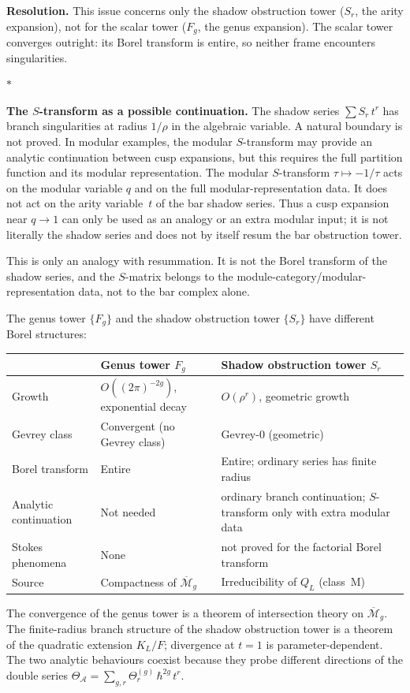 \documentclass[11pt]{article}
\newcommand{\cA}{\mathcal{A}}
\newcommand{\cM}{\mathcal{M}}
\newcommand{\sep}{\bigskip\begin{center}$*$\end{center}\medskip}
\begin{document}
\medskip
\noindent\textbf{Resolution.}\enspace
This issue concerns only the shadow obstruction tower
($S_r$, the arity expansion), not for the scalar tower
($F_g$, the genus expansion).  The scalar tower converges
outright: its Borel transform is entire, so neither frame
encounters singularities.

\sep

\noindent\textbf{The $S$-transform as a possible continuation.}\enspace
The shadow series $\sum S_r\,t^r$ has branch singularities at
radius $1/\rho$ in the algebraic variable.  A natural boundary is
not proved.  In modular examples, the modular $S$-transform may
provide an analytic continuation between cusp expansions, but this
requires the full partition function and its modular representation.
The modular $S$-transform $\tau \mapsto -1/\tau$ acts on the
modular variable $q$ and on the full modular-representation data.
It does not act on the arity variable~$t$ of the bar shadow series.
Thus a cusp expansion near $q\to1$ can only be used as an analogy
or an extra modular input; it is not literally the shadow series
and does not by itself resum the bar obstruction tower.

This is only an analogy with resummation.  It is not the Borel
transform of the shadow series, and the $S$-matrix belongs to the
module-category/modular-representation data, not to the bar complex
alone.

\begin{observation}
\label{obs:two-borel-types}
The genus tower $\{F_g\}$ and the shadow obstruction tower $\{S_r\}$ have
different Borel structures:
\begin{center}
\small
\renewcommand{\arraystretch}{1.15}
\begin{tabular}{@{}lll@{}}
  & \textbf{Genus tower $F_g$}
  & \textbf{Shadow obstruction tower $S_r$} \\
\hline
Growth
  & $O((2\pi)^{-2g})$, exponential decay
  & $O(\rho^r)$, geometric growth \\[3pt]
Gevrey class
  & Convergent (no Gevrey class)
  & Gevrey-$0$ (geometric) \\[3pt]
Borel transform
  & Entire
  & Entire; ordinary series has finite radius \\[3pt]
Analytic continuation
  & Not needed
  & ordinary branch continuation; $S$-transform only with extra modular data \\[3pt]
Stokes phenomena
  & None
  & not proved for the factorial Borel transform \\[3pt]
Source
  & Compactness of $\overline{\cM}_g$
  & Irreducibility of $Q_L$ (class~M)
\end{tabular}
\end{center}
The convergence of the genus tower is a theorem of intersection
theory on $\overline{\cM}_g$.  The finite-radius branch structure of
the shadow obstruction tower is a theorem of the quadratic extension
$K_L/F$; divergence at $t=1$ is parameter-dependent.  The two
analytic behaviours coexist because they probe different
directions of the double series $\Theta_\cA = \sum_{g,r}
\Theta_r^{(g)}\,\hbar^{2g}\,t^r$.
\end{observation}
\end{document}
